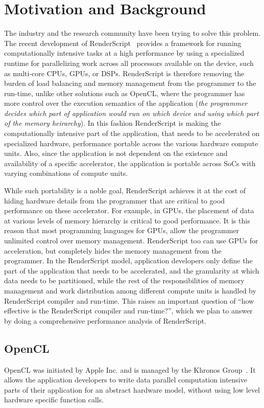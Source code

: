 \section{Motivation and Background}
The industry and the research community have been trying to solve this problem.
The recent development of RenderScript~\cite{wiki:RenderScript, RenderScript}
provides a framework
for running computationally intensive tasks at a high performance by using a
specialized runtime for 
parallelizing work across all processors available on the device, such as
multi-core CPUs, GPUs, or DSPs. RenderScript is therefore removing the
burden of load balancing and memory management from the programmer to the run-time, unlike other
solutions such as OpenCL, where the programmer has more control over the
execution semantics of the application ({\em the programmer decides which part
of application would run on which device and using which part of the memory heirarchy}).
In this fashion RenderScript is
making the computationally intensive part of the application, that needs to be
accelerated on specialized hardware, performance portable across the various hardware compute
units. Also, since the application is not dependent on the existence and
availability of a specific accelerator, the application is portable across SoCs
with varying combinations of compute units.

While such portability is a noble goal, RenderScript achieves it at the cost of
hiding hardware details from the programmer that are critical to good
performance on these accelerator. For example, in GPUs, the placement of data at
various levels of memory hierarchy is critical to good performance.
It is this reason that most programming languages for GPUs, allow the programmer
unlimited control over memory management. RenderScript too can use GPUs for acceleration, but
completely hides the memory management from the programmer. In the RenderScript
model, application developers only define the part of the application that needs
to be accelerated, and the granularity at which data needs to be partitioned,
while the rest of the responsibilities of memory management and work distribution
among different compute units is handled by RenderScript compiler and run-time.
This raises an important
question of ``how effective is the RenderScript compiler and run-time?'', which
we plan to answer by doing a comprehensive performance analysis of RenderScript.

\subsection{OpenCL}
OpenCL was initiated by Apple Inc. and is managed by the Khronos
Group~\cite{Khronos:url}. It allows the application developers to write
data parallel computation intensive parts of their application for an abstract
hardware model, without using low level hardware specific function calls.

